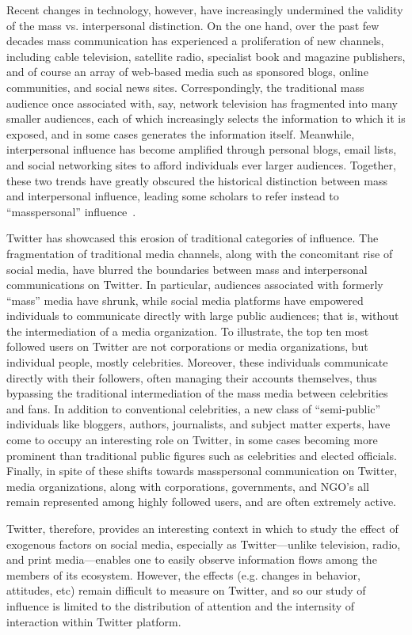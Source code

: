 \documentclass[phd,tocprelim]{cornell}
\begin{document}
Recent changes in technology, however, have increasingly undermined the validity of the mass vs. interpersonal distinction.  On the one hand, over the past few decades mass communication has experienced a proliferation of new channels, including cable television, satellite radio, specialist book and magazine publishers, and of course an array of web-based media such as sponsored blogs, online communities, and social news sites. Correspondingly, the traditional mass audience once associated with, say, network television
has fragmented into many smaller audiences, each of which increasingly selects the information to which it is exposed, and in some cases generates the information itself.  Meanwhile, interpersonal influence has become amplified through personal blogs, email lists, and social networking sites to afford individuals ever larger audiences. Together, these two trends have greatly obscured the historical distinction between mass and interpersonal influence, leading some scholars to refer instead to
``masspersonal'' influence~\cite{walther_10}.

Twitter has showcased this erosion of traditional categories of influence.
The fragmentation of
traditional media channels, along with the concomitant rise of social
media, have blurred the boundaries between mass and interpersonal
communications on Twitter. In particular, audiences associated with formerly
``mass'' media have shrunk, while social media platforms have
empowered individuals to communicate directly with large public
audiences; that is, without the intermediation of a media
organization. 
To illustrate, the top ten most followed users on Twitter are not
corporations or media organizations, but individual people, mostly
celebrities. Moreover, these individuals communicate directly with their
followers, often managing their accounts themselves, thus bypassing the
traditional intermediation of the mass media between celebrities and fans.
In addition to conventional celebrities, a new class of ``semi-public''
individuals like bloggers, authors, journalists, and subject matter
experts, have come to occupy an interesting role on Twitter, in some cases
becoming more prominent than traditional public figures such as celebrities
and elected officials.  Finally, in spite of these shifts towards
masspersonal communication on Twitter, media organizations, along with
corporations, governments, and NGO's all remain represented among highly
followed users, and are often extremely active.

Twitter, therefore, provides an interesting context in which to study the effect of exogenous factors on social media, especially as Twitter---unlike television, radio, and print media---enables one to easily observe information flows among the members of its ecosystem.  However, the effects (e.g. changes in behavior, attitudes, etc) remain difficult to measure on Twitter, and so our study of influence is limited to the distribution of attention and the internsity of interaction within Twitter platform.
\end{document}
